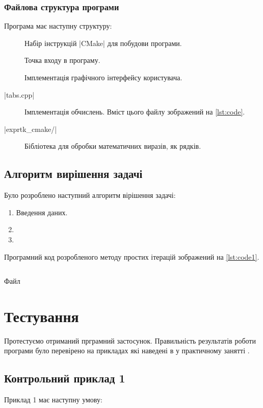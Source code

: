 \documentclass[../../../../document]{subfiles}
\begin{document}
	\subsection{Файлова структура програми}
	Програма має наступну структуру:
	\begin{description}
		\item[]
			Набір інструкцій \textinline|CMake| для побудови програми. 
		\item[]
			Точка входу в програму. 
		\item[]
			Імплементація графічного інтерфейсу користувача. 
		\item[\textinline|tabs.cpp|]
			Імплементація обчислень. Вміст цього файлу зображений на \cref{lst:code}.
		\item[\textinline|exprtk_cmake/|] Бібліотека для обробки математичних виразів, як рядків.
	\end{description}

	\section{Алгоритм вирішення задачі}
	Було розроблено наступний алгоритм вірішення задачі:
	\begin{enumerate}
		\item Введення даних. 
		\item
		\item
	\end{enumerate}	

	Програмний код розробленого методу простих ітерацій зображений на \cref{lst:code1}.
	\begin{longlisting}
		 \begin{Center}
			 \inputminted{cpp}{\subfix{../../../../../include/iter.cpp}}
		 \end{Center}
		 \caption{Файл }\label{lst:code1}
	\end{longlisting}

	\FloatBarrier
	\chapter{Тестування}
	Протестуємо отриманий прграмний застосунок. 
	Правильність результатів роботи програми було перевірено на прикладах які наведені в \cite{computational_methods} у практичному занятті \prodnumber{}.
	\section{Контрольний приклад 1}
	Приклад 1 має наступну умову:
\end{document}
